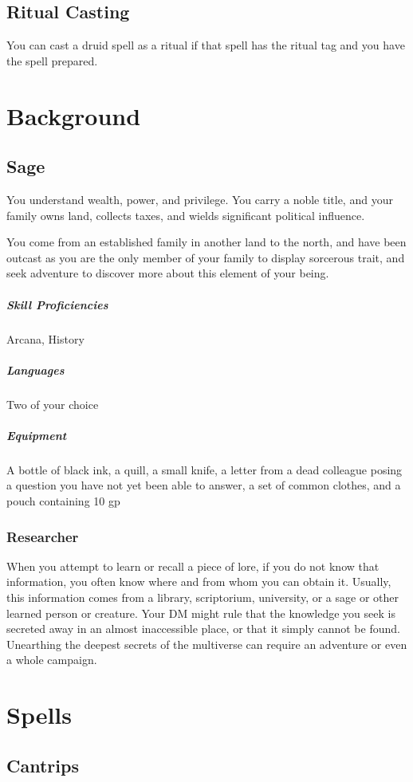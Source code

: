 \documentclass[a4paper,openany,twocolumn]{book}
\begin{document}
\subsection*{Ritual Casting}
You can cast a druid spell as a ritual if that spell has the ritual tag and you
have the spell prepared.

\section*{Background}
\subsection*{Sage}
You understand wealth, power, and privilege. You carry a noble title, and your family owns land, collects taxes, and wields significant political influence.

You come from an established family in another land to the north, and have been outcast as you are the only member of your family to display sorcerous trait, and seek adventure to discover more about this element of your being.

\subparagraph*{Skill Proficiencies} Arcana, History
\subparagraph*{Languages} Two of your choice
\subparagraph*{Equipment}  A bottle of black ink, a quill, a small knife, a
letter from a dead colleague posing a question you have not yet been able to
answer, a set of common clothes, and a pouch containing 10 gp


\subsubsection*{Researcher}
When you attempt to learn or recall a piece of lore, if you do not know that
information, you often know where and from whom you can obtain it. Usually, this
information comes from a library, scriptorium, university, or a sage or other
learned person or creature. Your DM might rule that the knowledge you seek is
secreted away in an almost inaccessible place, or that it simply cannot be
found. Unearthing the deepest secrets of the multiverse can require an adventure
or even a whole campaign.


\section*{Spells}
\subsection*{Cantrips}
\end{document}
